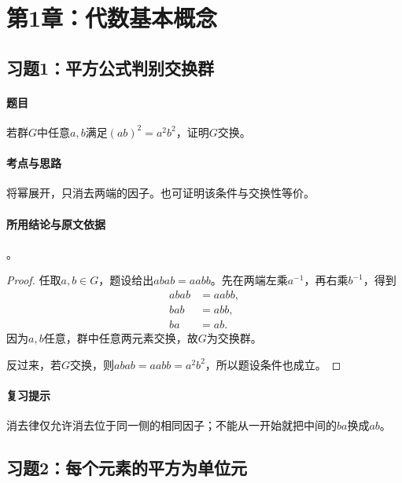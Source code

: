 \clearpage\section{第1章：代数基本概念}

\subsection{习题1：\texorpdfstring{平方公式判别交换群}{平方公式判别交换群}}
\label{ex:1:1}

\paragraph{题目}
若群$G$中任意$a,b$满足$(ab)^2=a^2b^2$，证明$G$交换。

\paragraph{考点与思路}
将幂展开，只消去两端的因子。也可证明该条件与交换性等价。

\paragraph{所用结论与原文依据}
。


\begin{proof}
任取$a,b\in G$，题设给出$abab=aabb$。先在两端左乘$a^{-1}$，再右乘$b^{-1}$，得到
\begin{align*}
abab&=aabb,\\
bab&=abb,\\
ba&=ab.
\end{align*}
因为$a,b$任意，群中任意两元素交换，故$G$为交换群。

反过来，若$G$交换，则$abab=aabb=a^2b^2$，所以题设条件也成立。
\end{proof}

\paragraph{复习提示}
消去律仅允许消去位于同一侧的相同因子；不能从一开始就把中间的$ba$换成$ab$。


\subsection{习题2：\texorpdfstring{每个元素的平方为单位元}{每个元素的平方为单位元}}
\label{ex:1:2}

